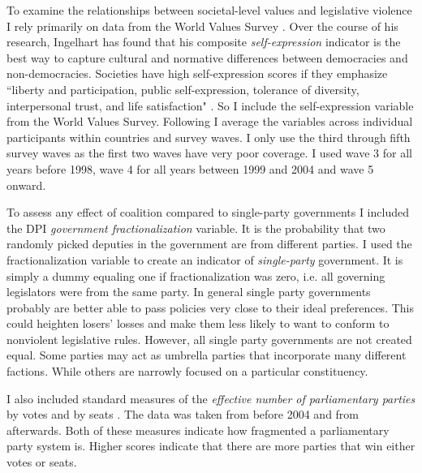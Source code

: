 \documentclass[a4paper]{article}\usepackage{graphicx, color}
\begin{document}
To examine the relationships between societal-level values and legislative violence I rely primarily on data from the World Values Survey \citeyearpar{WVS2009}. Over the course of his research, Ingelhart has found that his composite {\emph{self-expression}} indicator is the best way to capture cultural and normative differences between democracies and non-democracies. Societies have high self-expression scores if they emphasize ``liberty and participation, public self-expression, tolerance of diversity, interpersonal trust, and life satisfaction" \citep[64]{Inglehart2003}. So I include the self-expression variable from the World Values Survey. Following \cite{Inglehart2003} I average the variables across individual participants within countries and survey waves. I only use the third through fifth survey waves as the first two waves have very poor coverage. I used wave 3 for all years before 1998, wave 4 for all years between 1999 and 2004 and wave 5 onward. 

To assess any effect of coalition compared to single-party governments I included the DPI {\emph{government fractionalization}} variable. It is the probability that two randomly picked deputies in the government are from different parties. I used the fractionalization variable to create an indicator of {\emph{single-party}} government. It is simply a dummy equaling one if fractionalization was zero, i.e. all governing legislators were from the same party. In general single party governments probably are better able to pass policies very close to their ideal preferences. This could heighten losers' losses and make them less likely to want to conform to nonviolent legislative rules. However, all single party governments are not created equal. Some parties may act as umbrella parties that incorporate many different factions. While others are narrowly focused on a particular constituency. 

I also included standard measures of the \emph{effective number of parliamentary parties} by votes and by seats \citep[see][]{Laakso1979, Taagepera1989}. The data was taken from \cite{Carey2011} before 2004 and from \cite{Gallagher2012} afterwards. Both of these measures indicate how fragmented a parliamentary party system is. Higher scores indicate that there are more parties that win either votes or seats.
\end{document}
